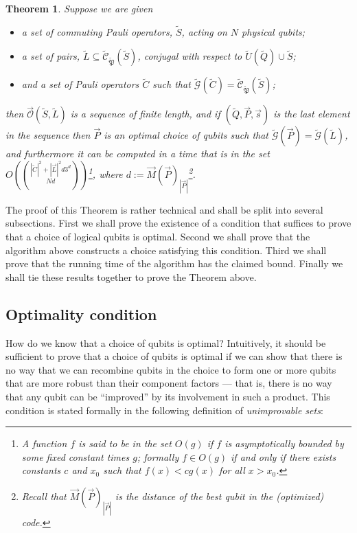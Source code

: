 \documentclass[12pt]{amsbook}
\theoremstyle{plain}
\newtheorem{theorem}{Theorem}
\theoremstyle{definition}
\theoremstyle{remark}
\newcommand{\lst}{\vec}
\newcommand{\set}{\tilde}
\newcommand{\genfun}{\tilde{\mathcal{G}}}
\newcommand{\pauligroup}{{\set{\mathfrak{P}}}}
\newcommand{\centralizer}{\set{\mathcal{C}}}
\newcommand{\optimizer}{\lst{\mathcal{O}}}
\newcommand{\paren}[1]{\left(#1\right)}
\begin{document}
\begin{theorem}
\label{theorem:optimization procedure}
Suppose we are given
\begin{itemize}
\item a set of commuting Pauli operators, $\set S$, acting on $N$ physical qubits;
\item a set of pairs, $\set L\subseteq\centralizer_\pauligroup(\set S)$, conjugal with respect to $\set U(\set Q)\cup\set S$;
\item and a set of Pauli operators $\set C$ such that $\genfun(\set C)=\centralizer_\pauligroup(\set S)$;
\end{itemize}
then $\optimizer(\set S,\set L)$ is a sequence of finite length, and if $(\set Q,\lst P,\lst s)$ is the last element in the sequence then $\lst P$ is an optimal choice of qubits such that $\genfun(\lst P)=\genfun(\set L)$, and furthermore it can be computed in a time that is in the set $O\paren{|\set C|^2+|\lst L|^2d3^d\choose{N}{d}}$\footnote{A function $f$ is said to be in the set $O(g)$ if $f$ is asymptotically bounded by some fixed constant times $g$;  formally $f\in O(g)$ if and only if there exists constants $c$ and $x_0$ such that $f(x)<c g(x)$ for all $x>x_0$.}, where $d:=\lst M(\lst P)_{|\lst P|}$\footnote{Recall that $\lst M(\lst P)_{|\lst P|}$ is the distance of the best qubit in the (optimized) code.}.
\end{theorem}

The proof of this Theorem is rather technical and shall be split into several subsections.  First we shall prove the existence of a condition that suffices to prove that a choice of logical qubits is optimal.   Second we shall prove that the algorithm above constructs a choice satisfying this condition.  Third we shall prove that the running time of the algorithm has the claimed bound.  Finally we shall tie these results together to prove the Theorem above.

\subsection{Optimality condition}

\label{optimal-generators}

How do we know that a choice of qubits is optimal?  Intuitively, it should be sufficient to prove that a choice of qubits is optimal if we can show that there is no way that we can recombine qubits in the choice to form one or more qubits that are more robust than their component factors --- that is, there is no way that any qubit can be ``improved'' by its involvement in such a product.  This condition is stated formally in the following definition of \emph{unimprovable sets}:
\end{document}
